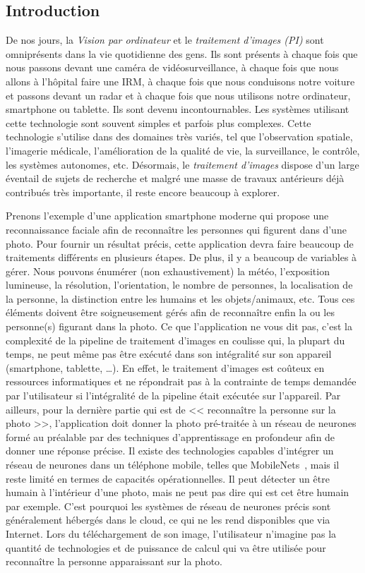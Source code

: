\subsection*{Introduction}


De nos jours, la \emph{Vision par ordinateur} et le \emph{traitement d'images (PI)} sont omniprésents dans la vie
quotidienne des gens. Ils sont présents à chaque fois que nous passons devant une caméra de vidéosurveillance, à chaque
fois que nous allons à l'hôpital faire une IRM, à chaque fois que nous conduisons notre voiture et passons devant un
radar et à chaque fois que nous utilisons notre ordinateur, smartphone ou tablette. Ils sont devenu incontournables. Les
systèmes utilisant cette technologie sont souvent simples et parfois plus complexes. Cette technologie s'utilise dans
des domaines très variés, tel que l'observation spatiale, l'imagerie médicale, l'amélioration de la qualité de vie, la
surveillance, le contrôle, les systèmes autonomes, etc. Désormais, le \emph{traitement d'images} dispose d'un large
éventail de sujets de recherche et malgré une masse de travaux antérieurs déjà contribués très importante, il reste
encore beaucoup à explorer.

Prenons l'exemple d'une application smartphone moderne qui propose une reconnaissance faciale afin de reconnaître les
personnes qui figurent dans d'une photo. Pour fournir un résultat précis, cette application devra faire beaucoup de
traitements différents en plusieurs étapes. De plus, il y a beaucoup de variables à gérer. Nous pouvons énumérer (non
exhaustivement) la météo, l'exposition lumineuse, la résolution, l'orientation, le nombre de personnes, la localisation
de la personne, la distinction entre les humains et les objets/animaux, etc. Tous ces éléments doivent être
soigneusement gérés afin de reconnaître enfin la ou les personne(s) figurant dans la photo. Ce que l'application ne vous
dit pas, c'est la complexité de la pipeline de traitement d'images en coulisse qui, la plupart du temps, ne peut même
pas être exécuté dans son intégralité sur son appareil (smartphone, tablette, \ldots). En effet, le traitement d'images
est coûteux en ressources informatiques et ne répondrait pas à la contrainte de temps demandée par l'utilisateur si
l'intégralité de la pipeline était exécutée sur l'appareil. Par ailleurs, pour la dernière partie qui est de <<
reconnaître la personne sur la photo >>, l'application doit donner la photo pré-traitée à un réseau de neurones formé au
préalable par des techniques d'apprentissage en profondeur afin de donner une réponse précise. Il existe des
technologies capables d'intégrer un réseau de neurones dans un téléphone mobile, telles que
MobileNets~\parencite{howard.2017.mobilenets}, mais il reste limité en termes de capacités opérationnelles. Il peut
détecter un être humain à l'intérieur d'une photo, mais ne peut pas dire qui est cet être humain par exemple. C'est
pourquoi les systèmes de réseau de neurones précis sont généralement hébergés dans le cloud, ce qui ne les rend
disponibles que via Internet. Lors du téléchargement de son image, l'utilisateur n'imagine pas la quantité de
technologies et de puissance de calcul qui va être utilisée pour reconnaître la personne apparaissant sur la photo.

